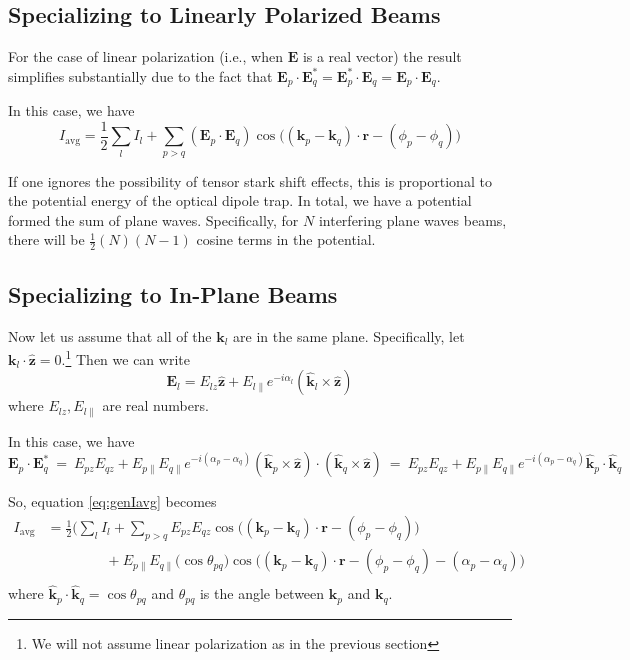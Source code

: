 \documentclass[11pt]{article}
\newcommand{\lef}{\left}
\newcommand{\rig}{\right}
\newcommand{\para}{\parallel}
\newcommand{\alp}{\alpha}
\newcommand{\tth}{\theta}
\newcommand{\ph}{\phi}
\newcommand{\vE}{\mathbf{E}}
\newcommand{\vk}{\mathbf{k}}
\newcommand{\vr}{\mathbf{r}}
\newcommand{\vkhat}{\mathbf{\hat{k}}}
\newcommand{\vzhat}{\mathbf{\hat{z}}}
\begin{document}
\subsection{Specializing to Linearly Polarized Beams}
For the case of linear polarization (i.e., when $\vE$ is a real vector) the result simplifies substantially due to the fact that $\vE_p\cdot \vE_q^*  = \vE_p^*\cdot \vE_q = \vE_p\cdot \vE_q$. 

In this case, we have
\[
I_\text{avg} = \frac{1}{2} \sum_l I_l + \sum_{p > q} \lef(\vE_p\cdot \vE_q \rig) \cos\Big((\vk_p-\vk_q) \cdot \vr - (\ph_p-\ph_q)\Big)
\]

If one ignores the possibility of tensor stark shift effects, this is proportional to the potential energy of the optical dipole trap.  In total, we have a potential formed the sum of plane waves.  Specifically, for $N$ interfering plane waves beams, there will be $\frac{1}{2}(N)(N-1)$ cosine terms in the potential.

\subsection{Specializing to In-Plane Beams}
\label{sec:InPlane}

Now let us assume that all of the $\vk_l$ are in the same plane.  Specifically, let $\vk_l \cdot \vzhat = 0$.\footnote{We will not assume linear polarization as in the previous section}  Then we can write 
\[
\vE_l = E_{lz}\vzhat + E_{l\para}e^{-i\alp_l} (\vkhat_l \times \vzhat)
\]
where $E_{lz}, E_{l\para}$ are real numbers.

In this case, we have
\[
\vE_p \cdot \vE_q^*\ =\ E_{pz}E_{qz} + E_{p\para}E_{q\para}e^{-i(\alp_p-\alp_q)} (\vkhat_p \times \vzhat)\cdot (\vkhat_q \times \vzhat) \ = \ E_{pz}E_{qz} + E_{p\para}E_{q\para} e^{-i(\alp_p-\alp_q)}\vkhat_p \cdot \vkhat_q
\]

So, equation \eqref{eq:genIavg} becomes
\begin{equation}
\begin{split}
I_\text{avg} &= \frac{1}{2} \Bigg( \sum_l I_l + \sum_{p > q} E_{pz}E_{qz} \cos\Big((\vk_p-\vk_q) \cdot \vr - (\ph_p-\ph_q)\Big)\\[1.5ex] 
& \ \ \ \ \ \ \ \ \ \ \ \ \ \ \ \ \ \ \ + E_{p\para}E_{q\para} \big(\cos\tth_{pq}\big) \cos\Big((\vk_p-\vk_q) \cdot \vr - (\ph_p-\ph_q) - (\alp_p-\alp_q)\Big) \\[1.5ex]
\end{split}
\end{equation}
where $\vkhat_p \cdot \vkhat_q = \cos\tth_{pq}$ and $\tth_{pq}$ is the angle between $\vk_p$ and $\vk_q$.
\end{document}
